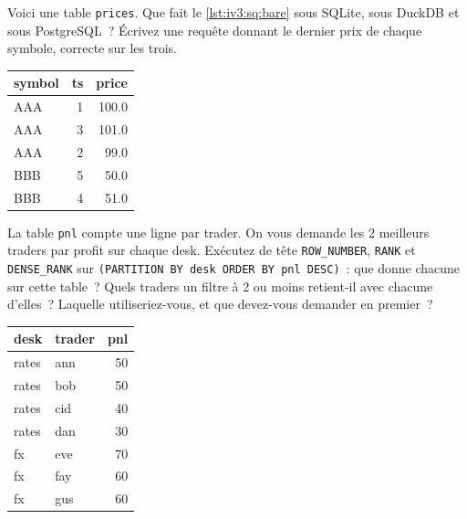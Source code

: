 \begin{question}\label{iq:iv3:sql-and-data:7}
Voici une table \texttt{prices}. Que fait le \cref{lst:iv3:sq:bare} sous SQLite, sous DuckDB et sous PostgreSQL~? Écrivez une requête donnant le dernier prix de chaque symbole, correcte sur les trois.
\begin{center}\small
\begin{tabular}{lrr}
symbol & ts & price\\\hline
AAA & 1 & 100.0\\
AAA & 3 & 101.0\\
AAA & 2 & 99.0\\
BBB & 5 & 50.0\\
BBB & 4 & 51.0
\end{tabular}
\end{center}
\label{lst:iv3:sq:bare}
\end{question}

\begin{question}\label{iq:iv3:sql-and-data:8}
La table \texttt{pnl} compte une ligne par trader. On vous demande les 2 meilleurs traders par profit sur chaque desk. Exécutez de tête \texttt{ROW\_NUMBER}, \texttt{RANK} et \texttt{DENSE\_RANK} sur \texttt{(PARTITION BY desk ORDER BY pnl DESC)}~: que donne chacune sur cette table~? Quels traders un filtre à 2 ou moins retient-il avec chacune d'elles~? Laquelle utiliseriez-vous, et que devez-vous demander en premier~?
\begin{center}\small
\begin{tabular}{llr}
desk & trader & pnl\\\hline
rates & ann & 50\\
rates & bob & 50\\
rates & cid & 40\\
rates & dan & 30\\
fx & eve & 70\\
fx & fay & 60\\
fx & gus & 60
\end{tabular}
\end{center}
\end{question}

